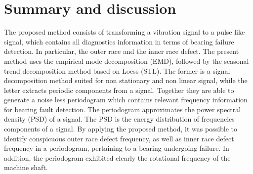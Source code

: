 \documentclass[../Main/thesis.tex]{subfiles}
\begin{document}
\section{Summary and discussion}
\label{sec:limitation}
The proposed method consists of transforming a vibration signal to a pulse like signal, which contains all diagnostics information in terms of bearing failure detection. In particular, the outer race and the inner race defect. The present method uses the empirical mode decomposition (EMD), followed by the seasonal trend decomposition method based on Loess (STL). The former is a signal decomposition method suited for non stationary and non linear signal, while the letter extracts periodic components from a signal.
\justify
Together they are able to generate a noise less periodogram which contains relevant frequency information for bearing fault detection. The periodogram approximates the power spectral density (PSD) of a signal. The PSD is the energy distribution of frequencies components of a signal.
By applying the proposed method, it was possible to identify conspicuous outer race defect frequency, as well as inner race defect frequency in a periodogram, pertaining to a bearing undergoing failure. In addition, the periodogram exhibited clearly the rotational frequency of the machine shaft.








\blankpage
\end{document}
